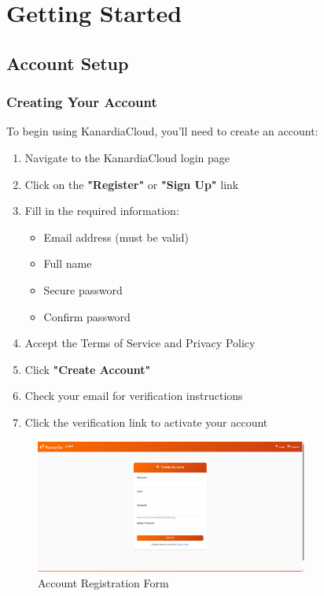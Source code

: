 \chapter{Getting Started}

\section{Account Setup}

\subsection{Creating Your Account}

To begin using KanardiaCloud, you'll need to create an account:

\begin{enumerate}
    \item Navigate to the KanardiaCloud login page
    \item Click on the \textbf{"Register"} or \textbf{"Sign Up"} link
    \item Fill in the required information:
    \begin{itemize}
        \item Email address (must be valid)
        \item Full name
        \item Secure password
        \item Confirm password
    \end{itemize}
    \item Accept the Terms of Service and Privacy Policy
    \item Click \textbf{"Create Account"}
    \item Check your email for verification instructions
    \item Click the verification link to activate your account
\end{enumerate}

\begin{figure}[H]
\centering
\includegraphics[width=0.8\textwidth]{images/registration_form.png}
\caption{Account Registration Form}
\label{fig:registration_form}
\end{figure}


